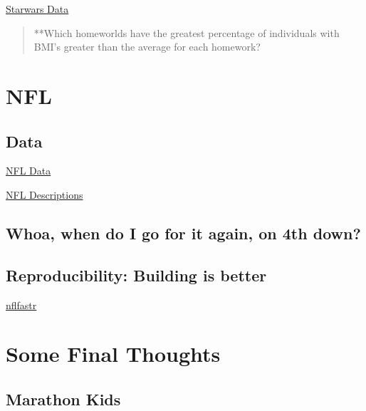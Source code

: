 \documentclass[
]{book}
\begin{document}
\href{https://github.com/tidyverse/dplyr/blob/master/data-raw/starwars.csv}{Starwars Data}

\begin{quote}
**Which homeworlds have the greatest percentage of individuals with BMI's greater than the average for each homework?
\end{quote}

\hypertarget{nfl}{%
\chapter{NFL}\label{nfl}}

\hypertarget{data-1}{%
\section{Data}\label{data-1}}

\href{https://github.com/nflverse/nflverse-data/releases/tag/pbp}{NFL Data}

\href{https://www.nflfastr.com/articles/field_descriptions.html}{NFL Descriptions}

\hypertarget{whoa-when-do-i-go-for-it-again-on-4th-down}{%
\section{Whoa, when do I go for it again, on 4th down?}\label{whoa-when-do-i-go-for-it-again-on-4th-down}}

\hypertarget{reproducibility-building-is-better}{%
\section{Reproducibility: Building is better}\label{reproducibility-building-is-better}}

\href{https://www.nflfastr.com/}{nflfastr}

\hypertarget{some-final-thoughts}{%
\chapter{Some Final Thoughts}\label{some-final-thoughts}}

\hypertarget{marathon-kids-1}{%
\section{Marathon Kids}\label{marathon-kids-1}}
\end{document}
